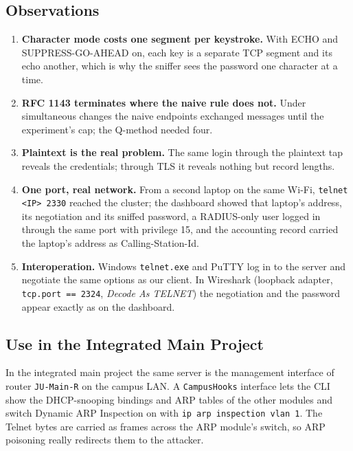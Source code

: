 \documentclass[11pt,a4paper]{article}
\begin{document}
\subsection{Observations}
\begin{enumerate}[leftmargin=2em]
    \item \textbf{Character mode costs one segment per keystroke.} With ECHO and SUPPRESS-GO-AHEAD on, each key is a separate TCP segment and its echo another, which is why the sniffer sees the password one character at a time.
    \item \textbf{RFC 1143 terminates where the naive rule does not.} Under simultaneous changes the naive endpoints exchanged messages until the experiment's cap; the Q-method needed four.
    \item \textbf{Plaintext is the real problem.} The same login through the plaintext tap reveals the credentials; through TLS it reveals nothing but record lengths.
    \item \textbf{One port, real network.} From a second laptop on the same Wi-Fi, \texttt{telnet <IP> 2330} reached the cluster; the dashboard showed that laptop's address, its negotiation and its sniffed password, a RADIUS-only user logged in through the same port with privilege 15, and the accounting record carried the laptop's address as Calling-Station-Id.
    \item \textbf{Interoperation.} Windows \texttt{telnet.exe} and PuTTY log in to the server and negotiate the same options as our client. In Wireshark (loopback adapter, \texttt{tcp.port == 2324}, \emph{Decode As TELNET}) the negotiation and the password appear exactly as on the dashboard.
\end{enumerate}

\subsection{Use in the Integrated Main Project}
In the integrated main project the same server is the management interface of router \texttt{JU-Main-R} on the campus LAN. A \texttt{CampusHooks} interface lets the CLI show the DHCP-snooping bindings and ARP tables of the other modules and switch Dynamic ARP Inspection on with \texttt{ip arp inspection vlan 1}. The Telnet bytes are carried as frames across the ARP module's switch, so ARP poisoning really redirects them to the attacker.

\end{document}
